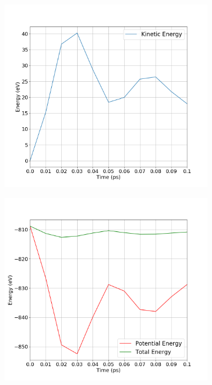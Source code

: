 \begin{figure}[!htbp]
	\begin{center}
		\begin{subfigure}[b]{0.5\textwidth}
			\includegraphics[width=\textwidth]{figs/k-dt=0.01.png} 
			\caption{}
		\end{subfigure}%
		\begin{subfigure}[b]{0.5\textwidth}
			\includegraphics[width=\textwidth]{figs/e-p-dt=0.01.png} 

\end{subfigure}
\end{center}
\end{figure}
